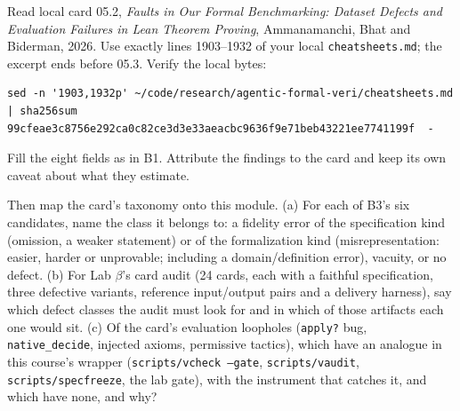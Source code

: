 \documentclass[11pt]{article}
\begin{document}
\begin{problem}\label{prob:B2}
Read local card 05.2, \emph{Faults in Our Formal Benchmarking: Dataset Defects
and Evaluation Failures in Lean Theorem Proving}, Ammanamanchi, Bhat and
Biderman, 2026. Use exactly lines 1903--1932 of your local
\texttt{cheatsheets.md}; the excerpt ends before 05.3. Verify the local bytes:
\begin{verbatim}
sed -n '1903,1932p' ~/code/research/agentic-formal-veri/cheatsheets.md | sha256sum
99cfeae3c8756e292ca0c82ce3d3e33aeacbc9636f9e71beb43221ee7741199f  -
\end{verbatim}
Fill the eight fields as in B1. Attribute the findings to the card and keep
its own caveat about what they estimate.

Then map the card's taxonomy onto this module. (a) For each of B3's six
candidates, name the class it belongs to: a fidelity error of the
specification kind (omission, a weaker statement) or of the formalization kind
(misrepresentation: easier, harder or unprovable; including a
domain/definition error), vacuity, or no defect. (b) For Lab $\beta$'s card
audit (24 cards, each with a faithful specification, three defective
variants, reference input/output pairs and a delivery harness), say which
defect classes the audit must look for and in which of those artifacts each
one would sit. (c) Of the card's evaluation loopholes (\texttt{apply?} bug,
\texttt{native\_decide}, injected axioms, permissive tactics), which have an
analogue in this course's wrapper (\texttt{scripts/vcheck --gate},
\texttt{scripts/vaudit}, \texttt{scripts/specfreeze}, the lab gate), with the
instrument that catches it, and which have none, and why?
\end{problem}
\end{document}
